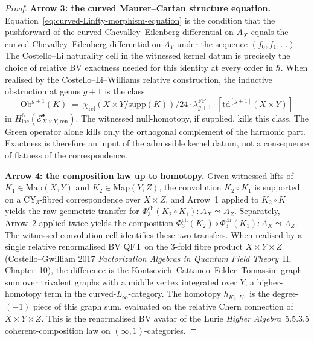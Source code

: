 \begin{proof}
\textbf{Arrow 3: the curved Maurer--Cartan structure equation.} Equation~\eqref{eq:curved-Linfty-morphism-equation} is the condition that the pushforward of the curved Chevalley--Eilenberg differential on $A_X$ equals the curved Chevalley--Eilenberg differential on $A_Y$ under the sequence $(f_0, f_1, \ldots)$. The Costello--Li naturality cell in the witnessed kernel datum is precisely the choice of relative BV exactness needed for this identity at every order in $\hbar$. When realised by the Costello--Li--Williams relative construction, the inductive obstruction at genus $g+1$ is the class
\[
 \mathrm{Ob}^{g+1}(K) \;=\; \chi_{\mathrm{rel}}(X \times Y / \mathrm{supp}(K))/24 \cdot \lambda_{g+1}^{\mathrm{FP}} \cdot [\mathrm{td}^{[g+1]}(X \times Y)]
\]
in $H^6_{\mathrm{loc}}(\mathcal{E}^\bullet_{X \times Y, \mathrm{ren}})$.
The witnessed null-homotopy, if supplied, kills this class. The Green
operator alone kills only the orthogonal complement of the harmonic
part. Exactness is therefore an input of the admissible kernel datum,
not a consequence of flatness of the correspondence.

\textbf{Arrow 4: the composition law up to homotopy.} Given witnessed lifts of $K_1 \in \mathrm{Map}(X, Y)$ and $K_2 \in \mathrm{Map}(Y, Z)$, the convolution $K_2 \circ K_1$ is supported on a CY$_3$-fibred correspondence over $X \times Z$, and Arrow~1 applied to $K_2 \circ K_1$ yields the raw geometric transfer for $\Phi_3^{\mathrm{ch}}(K_2 \circ K_1) \colon A_X \leadsto A_Z$. Separately, Arrow~2 applied twice yields the composition $\Phi_3^{\mathrm{ch}}(K_2) \circ \Phi_3^{\mathrm{ch}}(K_1) \colon A_X \leadsto A_Z$. The witnessed convolution cell identifies these two transfers. When realised by a single relative renormalised BV QFT on the $3$-fold fibre product $X \times Y \times Z$ (Costello--Gwilliam 2017 \textit{Factorization Algebras in Quantum Field Theory}~II, Chapter~10), the difference is the Kontsevich--Cattaneo--Felder--Tomassini graph sum over trivalent graphs with a middle vertex integrated over $Y$, a higher-homotopy term in the curved-$L_\infty$-category. The homotopy $h_{K_2, K_1}$ is the degree-$(-1)$ piece of this graph sum, evaluated on the relative Chern connection of $X \times Y \times Z$. This is the renormalised BV avatar of the Lurie \textit{Higher Algebra}~5.5.3.5 coherent-composition law on $(\infty,1)$-categories.
\end{proof}

